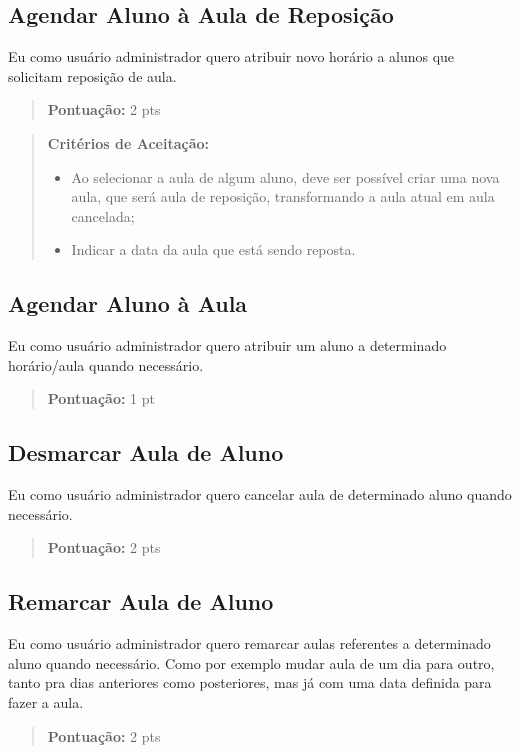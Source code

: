 \subsection[Agendar Aluno à Aula de Reposição]{Agendar Aluno à Aula de Reposição}
Eu como usuário administrador quero atribuir novo horário a alunos que solicitam
reposição de aula.
\begin{quote}
    \textbf{Pontuação:} 2 pts
\end{quote}
\begin{quote}
\textbf{Critérios de Aceitação:}
    \begin{itemize}
        \item Ao selecionar a aula de algum aluno, deve ser possível criar uma nova aula,
        que será aula de reposição, transformando a aula atual em aula cancelada;
        \item Indicar a data da aula que está sendo reposta.
    \end{itemize}
\end{quote}

\subsection[Agendar Aluno à Aula]{Agendar Aluno à Aula}
Eu como usuário administrador quero atribuir um aluno a determinado
horário/aula quando necessário.
\begin{quote}
    \textbf{Pontuação:} 1 pt
\end{quote}

\subsection[Desmarcar Aula de Aluno]{Desmarcar Aula de Aluno}
Eu como usuário administrador quero cancelar aula de determinado aluno quando
necessário.
\begin{quote}
    \textbf{Pontuação:} 2 pts
\end{quote}

\subsection[Remarcar Aula de Aluno]{Remarcar Aula de Aluno}
Eu como usuário administrador quero remarcar aulas referentes a determinado
aluno quando necessário. Como por exemplo mudar aula de um dia para outro,
tanto pra dias anteriores como posteriores, mas já com uma data definida
para fazer a aula.
\begin{quote}
    \textbf{Pontuação:} 2 pts
\end{quote}

